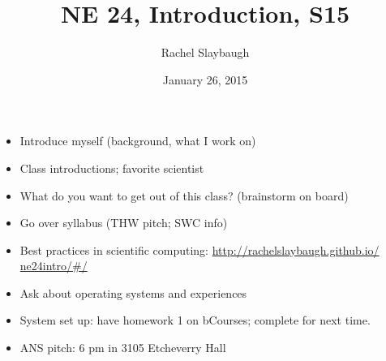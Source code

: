\documentclass[12pt]{article}
\title{NE 24, Introduction, S15}
\author{Rachel Slaybaugh}
\date{January 26, 2015}
\begin{document}
\maketitle

\begin{itemize}
\item Introduce myself (background, what I work on)

\item Class introductions; favorite scientist

\item What do you want to get out of this class? (brainstorm on board)

\item Go over syllabus (THW pitch; SWC info)

\item Best practices in scientific computing: \href{http://rachelslaybaugh.github.io/ne24intro/\#/}{http://rachelslaybaugh.github.io/\\ne24intro/\#/}

\item Ask about operating systems and experiences

\item System set up: have homework 1 on bCourses; complete for next time.

\item ANS pitch: 6 pm in 3105 Etcheverry Hall

\end{itemize}
\end{document}
